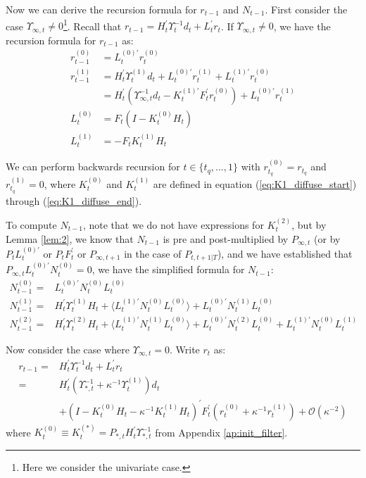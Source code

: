 \documentclass[10pt]{article}
\numberwithin{equation}{section}
\begin{document}
Now we can derive the recursion formula for $r_{t-1}$ and $N_{t-1}$. First consider the case $\Upsilon_{\infty,t}\neq0$\footnote{Here we consider the univariate case.}. Recall that $r_{t-1} = H_t^{'}\Upsilon_{t}^{-1}d_t + L_t^{'}r_t$. If $\Upsilon_{\infty,t}\neq0$, we have the recursion formula for $r_{t-1}$ as:
\begin{align}
    r_{t-1}^{(0)} &= L_t^{(0)'}r_t^{(0)} \label{eq:r_inf_start} \\
    r_{t-1}^{(1)} &= H_t^{'}\Upsilon_{t}^{(1)}d_t+L_t^{(0)'}r_t^{(1)} + L_t^{(1)'}r_t^{(0)} \nonumber \\
        &= H_t^{'}(\Upsilon_{\infty,t}^{-1}d_t-K_t^{(1)'}F_t^{'}r_t^{(0)}) + L_t^{(0)'}r_t^{(1)} \label{eq:r_inf_end} \\
    L_t^{(0)} &= F_t(I-K_t^{(0)}H_t) \nonumber \\
    L_t^{(1)} &= -F_tK_t^{(1)}H_t \nonumber
\end{align}

We can perform backwards recursion for $t\in\{t_q,...,1\}$ with $r_{t_q}^{(0)}=r_{t_q}$ and $r_{t_q}^{(1)}=0$, where $K_t^{(0)}$ and $K_t^{(1)}$ are defined in equation (\ref{eq:K1_diffuse_start}) through (\ref{eq:K1_diffuse_end}). 

To compute $N_{t-1}$, note that we do not have expressions for $K_t^{(2)}$, but by Lemma \ref{lem:2}, we know that $N_{t-1}$ is pre and post-multiplied by $P_{\infty,t}$ (or by $P_{t}L_{t}^{(0)'}$ or $P_tF_t^{'}$ or $P_{\infty,t+1}$ in the case of $P_{t,t+1|T}$), and we have established that $P_{\infty,t}L_t^{(0)'}N_{t}^{(0)}=0$, we have the simplified formula for $N_{t-1}$:
\begin{align}
    N_{t-1}^{(0)} =& L_t^{(0)'}N_t^{(0)}L_t^{(0)} \label{eq:N_inf_start} \\
    N_{t-1}^{(1)} =& H_t^{'}\Upsilon_t^{(1)}H_t + \langle L_t^{(1)'}N_t^{(0)}L_t^{(0)}\rangle + L_t^{(0)'}N_t^{(1)}L_t^{(0)} \\
    N_{t-1}^{(2)} =& H_t^{'}\Upsilon_t^{(2)}H_t + \langle L_t^{(1)'}N_t^{(1)}L_t^{(0)}\rangle + L_t^{(0)'}N_t^{(2)}L_t^{(0)}
        + L_t^{(1)'}N_t^{(0)}L_t^{(1)} \label{eq:N_inf_end}
\end{align}

Now consider the case where $\Upsilon_{\infty,t}=0$. Write $r_t$ as:
\begin{align*}
    r_{t-1} =& H_t^{'}\Upsilon_t^{-1}d_t + L_t^{'}r_t \\
    =& H_t^{'}(\Upsilon_{*,t}^{-1}+\kappa^{-1}\Upsilon_t^{(1)})d_t \\
    &+(I-K_t^{(0)}H_t-\kappa^{-1}K_t^{(1)}H_t)^{'}F_t^{'}(r_t^{(0)}+\kappa^{-1}r_t^{(1)}) + \mathcal{O}(\kappa^{-2})
\end{align*}
where $K_t^{(0)}\equiv K_t^{(*)}=P_{*,t}H_t^{'}\Upsilon_{*,t}^{-1}$ from Appendix \ref{ap:init_filter}.
\end{document}
